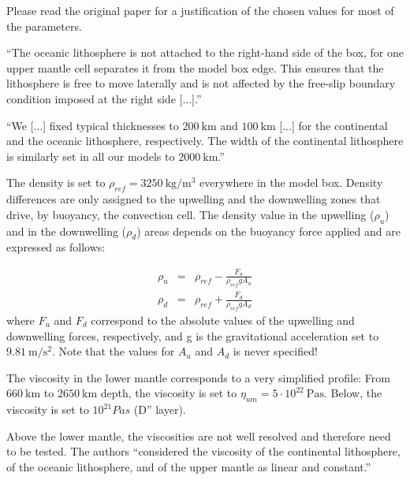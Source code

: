 Please read the original paper for a justification of the chosen values for most 
of the parameters.

``The oceanic lithosphere is not attached
to the right-hand side of the box, for one upper mantle cell
separates it from the model box edge. This ensures that the
lithosphere is free to move laterally and is not affected by
the free-slip boundary condition imposed at the right side [...].''

``We [...] fixed typical thicknesses to
$200~\si{\km}$ and $100~\si{\km}$ [...] for the continental and the oceanic lithosphere, 
respectively. The width of the continental lithosphere is similarly
set in all our models to $2000~\si{\km}$.''

The density is set to $\rho_{ref}=3250~\si{\kg\per\cubic\meter}$ everywhere in the model box. Density
differences are only assigned to the upwelling and the
downwelling zones that drive, by buoyancy, the convection
cell. The density value in the upwelling ($\rho_u$) and
in the downwelling ($\rho_d$) areas depends on the buoyancy force
applied and are expressed as follows:

\begin{eqnarray}
\rho_u &=& \rho_{ref} - \frac{F_u}{\rho_{ref} g A_u} \\
\rho_d &=& \rho_{ref} + \frac{F_d}{\rho_{ref} g A_d} 
\end{eqnarray}
where $F_u$ and $F_d$ correspond to the absolute values of the 
upwelling and downwelling forces, respectively, and g is the gravitational 
acceleration set to $9.81~\si{\meter\per\square\second}$.
Note that the values for $A_u$ and $A_d$ is never specified!

The viscosity in the lower mantle corresponds
to a very simplified profile: From $660~\si{\km}$ to $2650~\si{\km}$ depth,
the viscosity is set to $\eta_{um}=5\cdot 10^{22}~\si{\pascal\second}$. 
Below, the viscosity is set to $10^{21} Pa s$ (D'' layer). 

Above the lower mantle, the viscosities
are not well resolved and therefore need to be tested.
The authors ``considered the viscosity of the continental 
lithosphere, of the oceanic lithosphere, and of the
upper mantle as linear and constant.''

